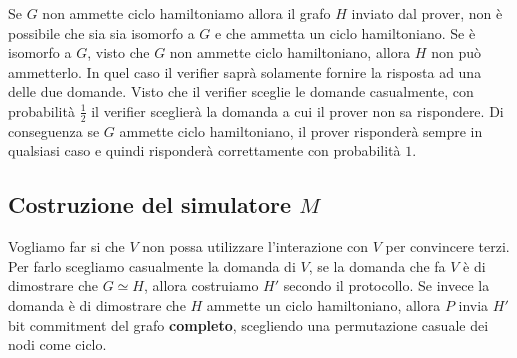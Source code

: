 Se $G$ non ammette ciclo hamiltoniamo allora il grafo $H$ inviato dal prover, non è possibile che sia sia isomorfo 
a $G$ e che ammetta un ciclo hamiltoniano. Se è isomorfo a $G$, visto che $G$ non ammette ciclo hamiltoniano, allora 
$H$ non può ammetterlo. In quel caso il verifier saprà solamente fornire la risposta ad una delle due domande.
Visto che il verifier sceglie le domande casualmente, con probabilità $\frac{1}{2}$ il verifier sceglierà la domanda
a cui il prover non sa rispondere.
Di conseguenza se $G$ ammette ciclo hamiltoniano, il prover risponderà sempre in qualsiasi caso e quindi 
risponderà correttamente con probabilità $1$.
\subsection{Costruzione del simulatore $M$}
Vogliamo far si che $V$ non possa utilizzare l'interazione con $V$ per convincere terzi.
Per farlo scegliamo casualmente la domanda di $V$, se la domanda che fa $V$ è di dimostrare che $G \simeq H$,
allora costruiamo $H'$ secondo il protocollo.
Se invece la domanda è di dimostrare che $H$ ammette un ciclo hamiltoniano, allora $P$ invia $H'$ 
bit commitment del grafo \textbf{completo}, scegliendo una permutazione casuale dei nodi come ciclo.
